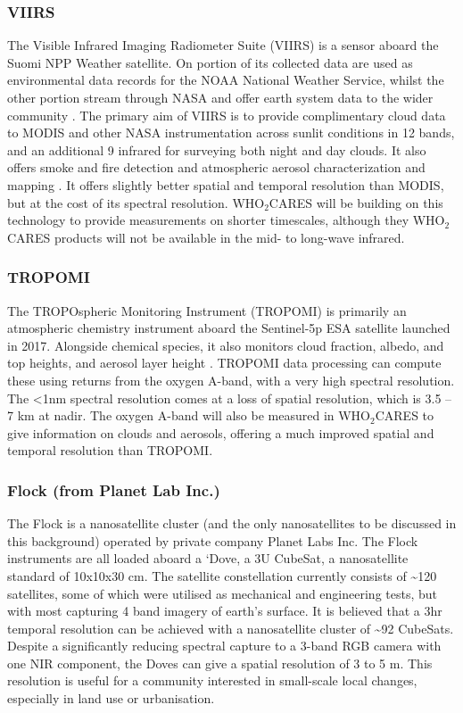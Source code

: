 \documentclass{scrartcl}
\newcommand{\whocares}{WHO$_2$CARES }
\begin{document}
\subsubsection{VIIRS}
\label{sec:orgdecaf60}

The Visible Infrared Imaging Radiometer Suite (VIIRS) is a sensor aboard
the Suomi NPP Weather satellite. On portion of its collected data are used as
environmental data records for the NOAA National Weather Service, whilst the
other portion stream through NASA and offer earth system data to the wider
community \citep{viirs}. The primary aim of VIIRS is to provide
complimentary cloud data to MODIS and other NASA instrumentation across sunlit
conditions in 12 bands, and an additional 9 infrared for surveying both night
and day clouds. It also offers smoke and fire detection and atmospheric aerosol
characterization and mapping \citep{viirs_book}. It offers slightly better
spatial and temporal resolution than MODIS, but at the cost of its spectral
resolution. \whocares will be building on this technology to provide
measurements on shorter timescales, although they \whocares products will not be
available in the mid- to long-wave infrared.

\subsubsection{TROPOMI}
\label{sec:orge34af6f}

The TROPOspheric Monitoring Instrument (TROPOMI) is primarily an atmospheric
chemistry instrument aboard the Sentinel-5p ESA satellite launched in 2017.
Alongside chemical species, it also monitors cloud fraction, albedo, and top
heights, and aerosol layer height \citep{tropomi}. TROPOMI data processing
can compute these using returns from the oxygen A-band, with a very high
spectral resolution. The <1nm spectral resolution comes at a loss of spatial
resolution, which is 3.5 – 7 km at nadir. The oxygen A-band will also be
measured in \whocares to give information on clouds and aerosols, offering a
much improved spatial and temporal resolution than TROPOMI.

\subsubsection{Flock (from Planet Lab Inc.)}
\label{sec:org7ced576}

The Flock is a nanosatellite cluster (and the only
nanosatellites to be discussed in this background) operated by private company
Planet Labs Inc. The Flock instruments are all loaded aboard a ‘Dove, a 3U
CubeSat, a nanosatellite standard of 10x10x30 cm. The satellite constellation
currently consists of \textasciitilde{}120 satellites, some of which were utilised as mechanical
and engineering tests, but with most capturing 4 band imagery of earth’s surface.
It is believed that a 3hr
temporal resolution can be achieved with a nanosatellite cluster of \textasciitilde{}92
CubeSats. Despite a significantly reducing spectral capture to a 3-band RGB
camera with one NIR component, the Doves can give a spatial resolution of 3 to 5
m. This resolution is useful for a community interested in small-scale local
changes, especially in land use or urbanisation.
\end{document}
